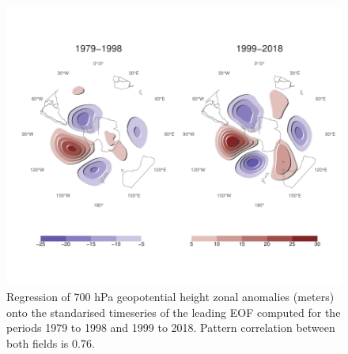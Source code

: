\documentclass[]{ametsocV5}
\begin{document}
\begin{figure}
\includegraphics{A11-1} \caption[Regression of 700 hPa geopotential height zonal anomalies (meters) onto the standarised timeseries of the leading EOF computed for the periods 1979 to 1998 and 1999 to 2018]{Regression of 700 hPa geopotential height zonal anomalies (meters) onto the standarised timeseries of the leading EOF computed for the periods 1979 to 1998 and 1999 to 2018. Pattern correlation between both fields is 0.76.}\label{fig:A11}
\end{figure}
\end{document}
